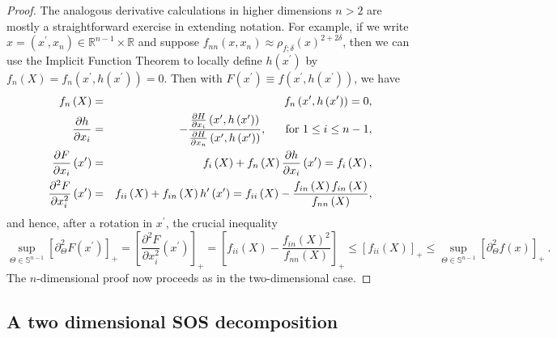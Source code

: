 \documentclass{amsart}
\theoremstyle{plain}
\numberwithin{equation}{section}
\begin{document}
\begin{proof}
The analogous derivative calculations in higher dimensions $n>2$ are mostly
a straightforward exercise in extending notation. For example, if we write $%
x=\left( x^{\prime },x_{n}\right) \in \mathbb{R}^{n-1}\times \mathbb{R}$ and
suppose $f_{nn}\left( x,x_{n}\right) \approx \rho _{f;\delta }\left(
x\right) ^{2+2\delta }$, then we can use the Implicit Function Theorem to
locally define $h\left( x^{\prime }\right) $ by $f_{n}\left( X\right)
=f_{n}\left( x^{\prime },h\left( x^{\prime }\right) \right) =0$. Then with $%
F\left( x^{\prime }\right) \equiv f\left( x^{\prime },h\left( x^{\prime
}\right) \right) $, we have%
\begin{eqnarray*}
f_{n}\left( X\right) &=&f_{n}\left( x^{\prime },h\left( x^{\prime }\right)
\right) =0, \\
\frac{\partial h}{\partial x_{i}} &=&-\frac{\frac{\partial H}{\partial x_{i}}%
\left( x^{\prime },h\left( x^{\prime }\right) \right) }{\frac{\partial H}{%
\partial x_{n}}\left( x^{\prime },h\left( x^{\prime }\right) \right) },\ \ \
\ \ \text{for }1\leq i\leq n-1, \\
\frac{\partial F}{\partial x_{i}}\left( x^{\prime }\right) &=&f_{i}\left(
X\right) +f_{n}\left( X\right) \frac{\partial h}{\partial x_{i}}\left(
x^{\prime }\right) =f_{i}\left( X\right) , \\
\frac{\partial ^{2}F}{\partial x_{i}^{2}}\left( x^{\prime }\right)
&=&f_{ii}\left( X\right) +f_{in}\left( X\right) h^{\prime }\left( x^{\prime
}\right) =f_{ii}\left( X\right) -\frac{f_{in}\left( X\right) f_{in}\left(
X\right) }{f_{nn}\left( X\right) },
\end{eqnarray*}%
and hence, after a rotation in $x^{\prime }$, the crucial inequality%
\begin{equation*}
\sup_{\Theta \in \mathbb{S}^{n-1}}\left[ \partial _{\Theta }^{2}F\left(
x^{\prime }\right) \right] _{+}=\left[ \frac{\partial ^{2}F}{\partial
x_{i}^{2}}\left( x^{\prime }\right) \right] _{+}=\left[ f_{ii}\left(
X\right) -\frac{f_{in}\left( X\right) ^{2}}{f_{nn}\left( X\right) }\right]
_{+}\leq \left[ f_{ii}\left( X\right) \right] _{+}\leq \sup_{\Theta \in 
\mathbb{S}^{n-1}}\left[ \partial _{\Theta }^{2}f\left( x\right) \right]
_{+}\ .
\end{equation*}%
The $n$-dimensional proof now proceeds as in the two-dimensional case.
\end{proof}

\subsection{A two dimensional SOS decomposition}
\end{document}
